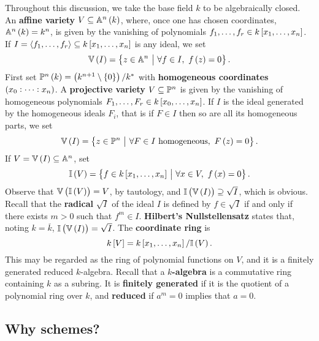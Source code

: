 Throughout this discussion, we take the base field $ k $ to be algebraically closed. An \textbf{affine variety} $ V \subseteq \AA^n\br{k} $, where, once one has chosen coordinates, $ \AA^n\br{k} = k^n $, is given by the vanishing of polynomials $ f_1, \dots, f_r \in k\sbr{x_1, \dots, x_n} $. If $ I = \abr{f_1, \dots, f_r} \subseteq k\sbr{x_1, \dots, x_n} $ is any ideal, we set
$$ \VV\br{I} = \cbr{z \in \AA^n \st \forall f \in I, \ f\br{z} = 0}. $$
First set $ \PP^n\br{k} = \br{k^{n + 1} \setminus \cbr{0}} / k^* $ with \textbf{homogeneous coordinates} $ \br{x_0 : \dots : x_n} $. A \textbf{projective variety} $ V \subseteq \mathbb{P}^n $ is given by the vanishing of homogeneous polynomials $ F_1, \dots, F_r \in k\sbr{x_0, \dots, x_n} $. If $ I $ is the ideal generated by the homogeneous ideals $ F_i $, that is if $ F \in I $ then so are all its homogeneous parts, we set
$$ \VV\br{I} = \cbr{z \in \PP^n \st \forall F \in I \ \text{homogeneous}, \ F\br{z} = 0}. $$
If $ V = \VV\br{I} \subseteq \AA^n $, set
$$ \II\br{V} = \cbr{f \in k\sbr{x_1, \dots, x_n} \st \forall x \in V, \ f\br{x} = 0}. $$
Observe that $ \VV\br{\II\br{V}} = V $, by tautology, and $ \II\br{\VV\br{I}} \supseteq \sqrt{I} $, which is obvious. Recall that the \textbf{radical} $ \sqrt{I} $ of the ideal $ I $ is defined by $ f \in \sqrt{I} $ if and only if there exists $ m > 0 $ such that $ f^m \in I $. \textbf{Hilbert's Nullstellensatz} states that, noting $ k = \overline{k} $, $ \II\br{\VV\br{I}} = \sqrt{I} $. The \textbf{coordinate ring} is
$$ k\sbr{V} = k\sbr{x_1, \dots, x_n} / \II\br{V}. $$
This may be regarded as the ring of polynomial functions on $ V $, and it is a finitely generated reduced $ k $-algebra. Recall that a \textbf{$ k $-algebra} is a commutative ring containing $ k $ as a subring. It is \textbf{finitely generated} if it is the quotient of a polynomial ring over $ k $, and \textbf{reduced} if $ a^m = 0 $ implies that $ a = 0 $.

\subsection{Why schemes?}

